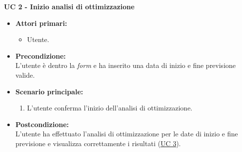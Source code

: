 \vspace{0.5cm}

\noindent \textbf{\large UC 2 - Inizio analisi di ottimizzazione}
\label{uc:inizio-analisi-ottimizzazione}
\begin{itemize}

	\item \textbf{Attori primari: }
		\begin{itemize}
			\item Utente.
		\end{itemize}

	\item \textbf{Precondizione: }\\[0.3cm]
		L'utente è dentro la \textit{form} e ha inserito una data di inizio e fine previsione valide.

	\item \textbf{Scenario principale: }
		\begin{enumerate}
			\item L'utente conferma l'inizio dell'analisi di ottimizzazione.
		\end{enumerate}
		

	\item \textbf{Postcondizione: }\\[0.3cm]
		L'utente ha effettuato l'analisi di ottimizzazione per le date di inizio e fine previsione e visualizza correttamente i
		risultati (\hyperref[uc:visualizzazione-risultati]{UC 3}).

\end{itemize}

\vspace{0.5cm}

